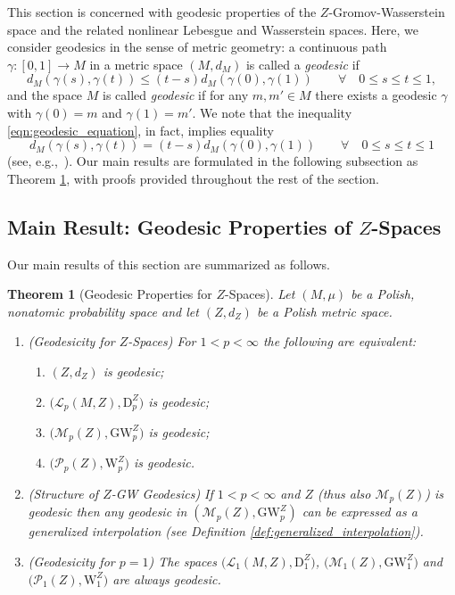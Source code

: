 \documentclass{article}
\newtheorem{theorem}{Theorem}
\theoremstyle{definition}
\newcommand{\M}{\mathcal{M}}
\newcommand{\MZp}{\M_p(Z)}
\newcommand{\MZ}[1]{\M_{#1}(Z)}
\newcommand{\dgwz}{\mathrm{GW}_p^Z}
\newcommand{\dgw}[1]{\mathrm{GW}_{#1}^Z}
\newcommand{\WZ}{\mathcal{P}_p(Z)}
\newcommand{\WZp}[1]{\mathcal{P}_{#1}(Z)}
\newcommand{\wz}{\mathrm{W}_p^Z}
\newcommand{\wzp}[1]{\mathrm{W}_{#1}^Z}
\newcommand{\Lp}{\mathcal{L}_p}
\newcommand{\Lpp}[1]{\mathcal{L}_{#1}}
\newcommand{\dpz}{\mathrm{D}^Z_p}
\newcommand{\dz}[1]{\mathrm{D}^Z_{#1}}
\begin{document}
This section is concerned with geodesic properties of the $Z$-Gromov-Wasserstein space and the related nonlinear Lebesgue and Wasserstein spaces. Here, we consider geodesics in the sense of metric geometry: a continuous path $\gamma:[0,1] \to M$ in a metric space $(M,d_M)$ is called a \emph{geodesic} if 
\begin{equation}\label{eqn:geodesic_equation}
d_M(\gamma(s),\gamma(t)) \leq (t-s)d_M(\gamma(0),\gamma(1)) \qquad \forall \quad 0 \leq s \leq t \leq 1,
\end{equation}
and the space $M$ is called \emph{geodesic} if for any $m,m' \in M$ there exists a geodesic $\gamma$ with $\gamma(0) = m$ and $\gamma(1) = m'$. We note that the inequality \eqref{eqn:geodesic_equation}, in fact, implies equality
\[
d_M(\gamma(s),\gamma(t)) = (t-s)d_M(\gamma(0),\gamma(1)) \qquad \forall \quad 0 \leq s \leq t \leq 1
\]
(see, e.g.,~\cite[Lemma 1.3]{chowdhury2018explicit}). Our main results are formulated in the following subsection as Theorem \ref{thm:geodesics_main}, with proofs provided throughout the rest of the section.

\subsection{Main Result: Geodesic Properties of \texorpdfstring{$Z$}{Z}-Spaces}\label{sec:geodesics_main_results}

Our main results of this section are summarized as follows.

\begin{theorem}[Geodesic Properties for $Z$-Spaces]\label{thm:geodesics_main}
Let $(M,\mu)$ be a Polish, nonatomic probability space and let $(Z,d_Z)$ be a Polish metric space.
\begin{enumerate}[label=(\arabic*)]
    \item (Geodesicity for $Z$-Spaces) For $1<p < \infty$ the following are equivalent:
\begin{enumerate}
\item $(Z,d_Z)$ is geodesic;
\item $\bigl(\Lp(M,Z),\dpz\bigr)$ is geodesic;
\item $\bigl(\MZp,\dgwz\bigr)$ is geodesic;
\item $\bigl(\WZ,\wz\bigr)$ is geodesic.
\end{enumerate}
\item (Structure of $Z$-GW Geodesics) If $1<p<\infty$ and $Z$ (thus also $\MZp$) is geodesic then any geodesic in  $(\MZp, \dgwz)$ can be expressed as a generalized interpolation (see Definition \ref{def:generalized_interpolation}). 
\item (Geodesicity for $p=1$) The spaces $\bigl(\Lpp{1}(M,Z),\dz{1}\bigr)$, $\bigl(\MZ{1},\dgw{1}\bigr)$ and $\bigl(\WZp{1},\wzp{1}\bigr)$ are always geodesic. 
\end{enumerate}
\end{theorem}
\end{document}
